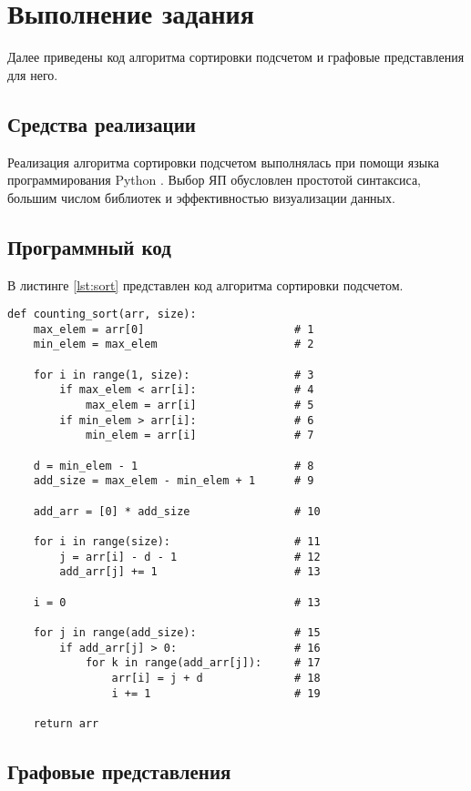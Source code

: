 \chapter{Выполнение задания}

Далее приведены код алгоритма сортировки подсчетом и графовые представления для него.

\section{Средства реализации}

Реализация алгоритма сортировки подсчетом выполнялась при помощи языка программирования Python \cite{python}. Выбор ЯП обусловлен простотой синтаксиса, большим числом библиотек и эффективностью визуализации данных.

\section{Программный код}

В листинге \ref{lst:sort} представлен код алгоритма сортировки подсчетом.
\clearpage
\begin{center}
\captionsetup{justification=raggedright,singlelinecheck=off}
\begin{lstlisting}[label=lst:sort,caption=Сортировка подсчетом]
def counting_sort(arr, size):
    max_elem = arr[0]                       # 1
    min_elem = max_elem                     # 2

    for i in range(1, size):                # 3
        if max_elem < arr[i]:               # 4
            max_elem = arr[i]               # 5
        if min_elem > arr[i]:               # 6
            min_elem = arr[i]               # 7
    
    d = min_elem - 1                        # 8
    add_size = max_elem - min_elem + 1      # 9

    add_arr = [0] * add_size                # 10

    for i in range(size):                   # 11
        j = arr[i] - d - 1                  # 12
        add_arr[j] += 1                     # 13
    
    i = 0                                   # 13

    for j in range(add_size):               # 15
        if add_arr[j] > 0:                  # 16
            for k in range(add_arr[j]):     # 17
                arr[i] = j + d              # 18
                i += 1                      # 19

    return arr
\end{lstlisting} 
\end{center}

\section{Графовые представления}